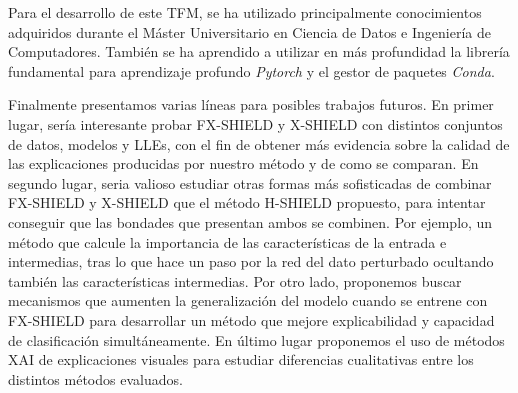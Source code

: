 Para el desarrollo de este TFM, se ha utilizado principalmente conocimientos adquiridos durante el Máster Universitario en Ciencia de Datos e Ingeniería de Computadores. También se ha aprendido a utilizar en más profundidad la librería fundamental para aprendizaje profundo \textit{Pytorch} y el gestor de paquetes \textit{Conda}.


Finalmente presentamos varias líneas para posibles trabajos futuros. En primer lugar, sería interesante probar FX-SHIELD y X-SHIELD con distintos conjuntos de datos, modelos y LLEs, con el fin de obtener más evidencia sobre la calidad de las explicaciones producidas por nuestro método y de como se comparan. En segundo lugar, seria valioso estudiar otras formas más sofisticadas de combinar FX-SHIELD y X-SHIELD que el método H-SHIELD propuesto, para intentar conseguir que las bondades que presentan ambos se combinen. Por ejemplo, un método que calcule la importancia de las características de la entrada e intermedias, tras lo que hace un paso por la red del dato perturbado ocultando también las características intermedias. Por otro lado, proponemos buscar mecanismos que aumenten la generalización del modelo cuando se entrene con FX-SHIELD para desarrollar un método que mejore explicabilidad y capacidad de clasificación simultáneamente. En último lugar proponemos el uso de métodos XAI de explicaciones visuales para estudiar diferencias cualitativas entre los distintos métodos evaluados.



